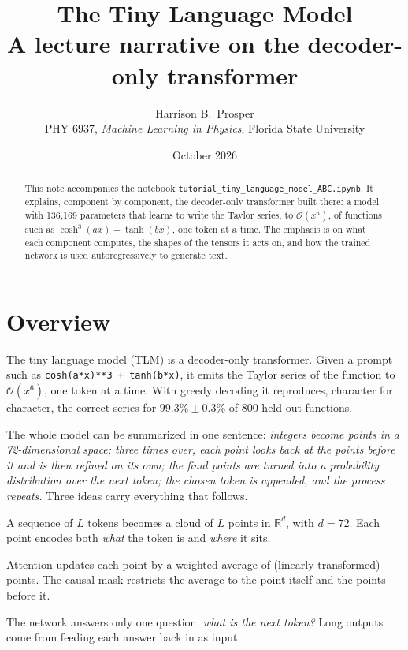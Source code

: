 \documentclass[11pt]{article}
\title{\textbf{The Tiny Language Model}\\[2pt]
  \large A lecture narrative on the decoder-only transformer}
\author{Harrison B.\ Prosper\\[2pt]
  \small PHY 6937, \emph{Machine Learning in Physics}, Florida State University}
\date{October 2026}
\newcommand{\code}[1]{\texttt{#1}}
\newcommand{\R}{\mathbb{R}}
\begin{document}
\maketitle

\begin{abstract}\noindent
This note accompanies the notebook \code{tutorial\_tiny\_language\_model\_ABC.ipynb}.
It explains, component by component, the decoder-only transformer built there:
a model with 136{,}169 parameters that learns to write the Taylor series, to
$\mathcal{O}(x^6)$, of functions such as $\cosh^3(ax)+\tanh(bx)$, one token at a
time. The emphasis is on what each component computes, the shapes of the tensors
it acts on, and how the trained network is used autoregressively to generate text.
\end{abstract}

\tableofcontents
\bigskip

\section{Overview}

The tiny language model (TLM) is a decoder-only transformer. Given a prompt such as
\code{cosh(a*x)**3 + tanh(b*x)}, it emits the Taylor series of the function to
$\mathcal{O}(x^6)$, one token at a time. With greedy decoding it reproduces, character
for character, the correct series for $99.3\% \pm 0.3\%$ of 800 held-out functions.

The whole model can be summarized in one sentence: \emph{integers become points in a
72-dimensional space; three times over, each point looks back at the points before
it and is then refined on its own; the final points are turned into a probability
distribution over the next token; the chosen token is appended, and the process
repeats.} Three ideas carry everything that follows.

\begin{description}[leftmargin=1.2em]
\item[Representation.] A sequence of $L$ tokens becomes a cloud of $L$ points in
  $\R^d$, with $d=72$. Each point encodes both \emph{what} the token is and
  \emph{where} it sits.
\item[Interaction.] Attention updates each point by a weighted average of (linearly
  transformed) points. The causal mask restricts the average to the point itself and
  the points before it.
\item[Generation.] The network answers only one question: \emph{what is the next
  token?} Long outputs come from feeding each answer back in as input.
\end{description}
\end{document}
